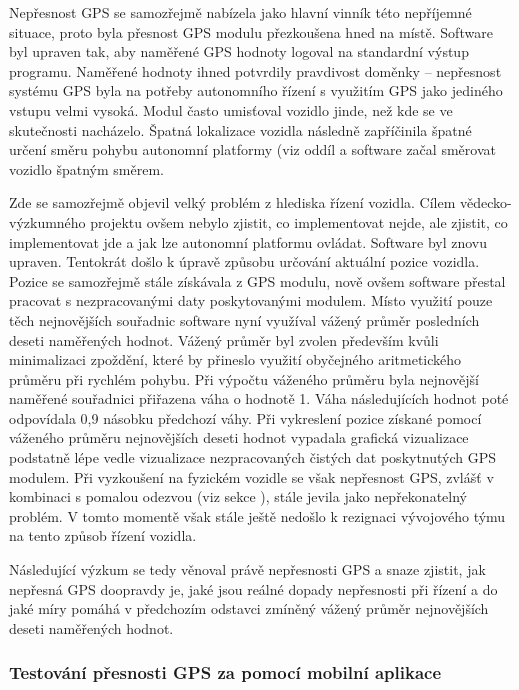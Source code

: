 \documentclass[czech, bachelor]{diploma}
\begin{document}
Nepřesnost GPS se samozřejmě nabízela jako hlavní vinník této nepříjemné situace, proto byla přesnost GPS modulu přezkoušena hned
na místě. Software byl upraven tak, aby naměřené GPS hodnoty logoval na standardní výstup programu. Naměřené hodnoty ihned 
potvrdily pravdivost doměnky -- nepřesnost systému GPS byla na potřeby autonomního řízení s využitím GPS jako jediného vstupu 
velmi vysoká. Modul často umisťoval vozidlo jinde, než kde se ve skutečnosti nacházelo. Špatná lokalizace vozidla následně 
zapříčinila špatné určení směru pohybu autonomní platformy (viz oddíl  a software začal směrovat
vozidlo špatným směrem.

Zde se samozřejmě objevil velký problém z hlediska řízení vozidla. Cílem vědecko-výzkumného projektu ovšem nebylo zjistit, co
implementovat nejde, ale zjistit, co implementovat jde a jak lze autonomní platformu ovládat. Software byl znovu upraven. 
Tentokrát došlo k úpravě způsobu určování aktuální pozice vozidla. Pozice se samozřejmě stále získávala z GPS modulu, nově ovšem
software přestal pracovat s nezpracovanými daty poskytovanými modulem. Místo využití pouze těch nejnovějších souřadnic software 
nyní využíval vážený průměr posledních deseti naměřených hodnot. Vážený průměr byl zvolen především kvůli minimalizaci zpoždění,
které by přineslo využití obyčejného aritmetického průměru při rychlém pohybu. Při výpočtu váženého průměru byla nejnovější 
naměřené souřadnici přiřazena váha o hodnotě 1. Váha následujících hodnot poté odpovídala 0,9 násobku předchozí váhy. 
Při vykreslení pozice získané pomocí váženého průměru nejnovějších deseti hodnot vypadala grafická vizualizace podstatně lépe 
vedle vizualizace nezpracovaných čistých dat poskytnutých GPS modulem. Při vyzkoušení na fyzickém vozidle se však nepřesnost GPS,
zvlášť v kombinaci s pomalou odezvou (viz sekce ), stále jevila jako nepřekonatelný problém. V tomto
momentě však stále ještě nedošlo k rezignaci vývojového týmu na tento způsob řízení vozidla.

Následující výzkum se tedy věnoval právě nepřesnosti GPS a snaze zjistit, jak nepřesná GPS doopravdy je, jaké jsou reálné dopady
nepřesnosti při řízení a do jaké míry pomáhá v předchozím odstavci zmíněný vážený průměr nejnovějších deseti naměřených hodnot.

\subsubsection{Testování přesnosti GPS za pomocí mobilní aplikace}
\end{document}
